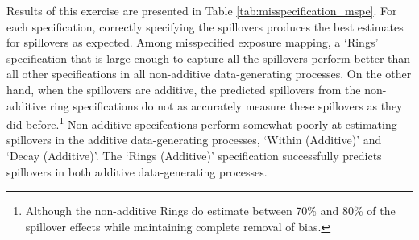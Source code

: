 \documentclass[11pt]{article}
\begin{document}
Results of this exercise are presented in Table \ref{tab:misspecification_mspe}. For each specification, correctly specifying the spillovers produces the best estimates for spillovers as expected. Among misspecified exposure mapping, a `Rings' specification that is large enough to capture all the spillovers perform better than all other specifications in all non-additive data-generating processes. On the other hand, when the spillovers are additive, the predicted spillovers from the non-additive ring specifications do not as accurately measure these spillovers as they did before.\footnote{Although the non-additive Rings do estimate between 70\% and 80\% of the spillover effects while maintaining complete removal of bias.} Non-additive specifcations perform somewhat poorly at estimating spillovers in the additive data-generating processes, `Within (Additive)' and `Decay (Additive)'. The `Rings (Additive)' specification successfully predicts spillovers in both additive data-generating processes. 
\end{document}
